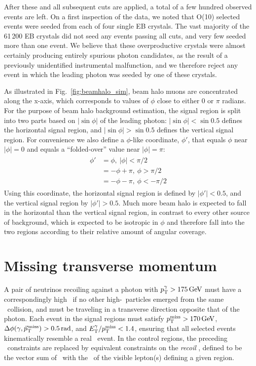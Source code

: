 After these and all subsequent cuts are applied, a total of a few hundred observed events are left. On a first inspection of the data, we noted that O(10) selected events
were seeded from each of four single EB crystals. The vast majority of the 61\,200 EB crystals did not seed any events passing all cuts, and very few seeded more than one event.
We believe that these overproductive crystals were almost certainly producing entirely spurious photon candidates, as the result of a previously unidentified
instrumental malfunction, and we therefore reject any event in which the leading photon was seeded by one of these crystals.

As illustrated in Fig.~\ref{fig:beamhalo_sim}, beam halo muons are concentrated along the x-axis, which corresponds to values of $\phi$ close to either 0 or $\pi$ radians.
For the purpose of beam halo background estimation, the signal region is split into two parts based on $|\sin{\phi}|$ of the leading photon: $|\sin{\phi}| < \sin{0.5}$ defines
the horizontal signal region, and $|\sin{\phi}| > \sin{0.5}$ defines the vertical signal region. For convenience we also define a $\phi$-like coordinate, $\phi'$, that equals $\phi$ near
$|\phi| = 0$ and equals a ``folded-over'' value near $|\phi| = \pi$:
\begin{align}
\begin{split}
\phi' & = \phi,\ |\phi| < \pi/2 \\
      & = -\phi + \pi,\ \phi > \pi/2 \\
      & = -\phi - \pi,\ \phi < -\pi/2
\end{split}
\label{eq:phiprime}
\end{align}
Using this coordinate, the horizontal signal region is defined by $|\phi'| < 0.5$, and the vertical signal region by $|\phi'| > 0.5$. Much more beam halo is expected to fall in the horizontal than the vertical
signal region, in contrast to every other source of background, which is expected to be isotropic in $\phi$ and therefore fall into the two regions according to their
relative amount of angular coverage.

\section{Missing transverse momentum} \label{sec:event_selection_MET}
A pair of neutrinos recoiling against a photon with $\pTgamma > 175\unit{GeV}$ must have a correspondingly high \pT\ if no other high-\pT\ particles emerged
from the same \Pp\Pp\ collision, and must be traveling in a transverse direction opposite that of the photon. Each event in the signal regions must satisfy
$\MET > 170\unit{GeV}$, $\Delta\phi(\Pgamma,\vecMET) > 0.5\unit{rad}$, and $\ETgamma/\MET < 1.4$, ensuring that all selected events kinematically resemble a real \zinvg\ event.
In the control regions, the preceding \vecMET\ constraints are replaced by equivalent constraints on the \textit{recoil} \vecrecoil, defined to be the vector sum of \vecMET\ with
the \vecpT\ of the visible lepton(s) defining a given region.

